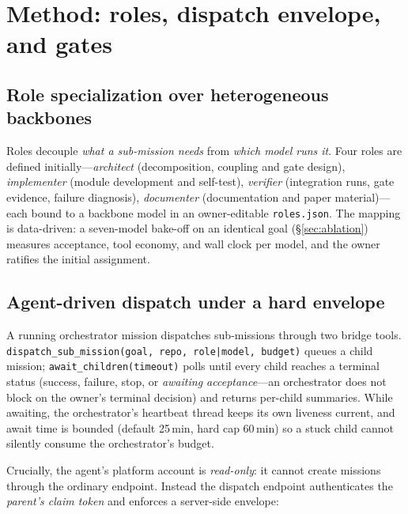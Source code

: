 \section{Method: roles, dispatch envelope, and gates}\label{sec:method}

\subsection{Role specialization over heterogeneous backbones}
Roles decouple \emph{what a sub-mission needs} from \emph{which model
runs it}. Four roles are defined initially---\textit{architect}
(decomposition, coupling and gate design), \textit{implementer}
(module development and self-test), \textit{verifier} (integration
runs, gate evidence, failure diagnosis), \textit{documenter}
(documentation and paper material)---each bound to a backbone model in
an owner-editable \texttt{roles.json}. The mapping is data-driven: a
seven-model bake-off on an identical goal (\S\ref{sec:ablation})
measures acceptance, tool economy, and wall clock per model, and the
owner ratifies the initial assignment.

\subsection{Agent-driven dispatch under a hard envelope}
A running orchestrator mission dispatches sub-missions through two
bridge tools. \texttt{dispatch\_sub\_mission(goal, repo, role|model,
budget)} queues a child mission; \texttt{await\_children(timeout)}
polls until every child reaches a terminal status (success, failure,
stop, or \emph{awaiting acceptance}---an orchestrator does not block on
the owner's terminal decision) and returns per-child summaries. While
awaiting, the orchestrator's heartbeat thread keeps its own liveness
current, and await time is bounded (default 25\,min, hard cap 60\,min)
so a stuck child cannot silently consume the orchestrator's budget.

Crucially, the agent's platform account is \emph{read-only}: it cannot
create missions through the ordinary endpoint. Instead the dispatch
endpoint authenticates the \emph{parent's claim token} and enforces a
server-side envelope:

